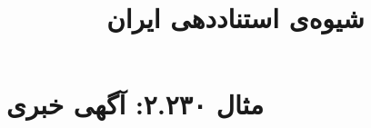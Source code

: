 \documentclass[a4paper,10pt]{article}
\begin{document}
\title{شیوه‌ی استناددهی ایران
 }
\author{}
\date{}
\maketitle



\section*{مثال ۲.۲۳۰: آگهی خبری}

\cite{حمل1384}\\
\cite{ntsb1995}\\






\end{document}
